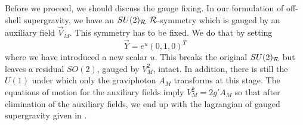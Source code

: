 \documentclass[a4paper,12pt, twoside]{article}
\numberwithin{equation}{section}
\begin{document}
Before we proceed, we should discuss the gauge fixing. In our 
formulation of off-shell supergravity, we have an $SU(2)_{\cal R}$ ${\cal 
R}$-symmetry which is gauged by an auxiliary field $\vec{V}_M$. This symmetry 
has to be fixed. We do that by setting \cite{deWit:1983na}
\begin{equation}
\vec{Y}=e^u(0,1,0)^T\label{eichfixx}
\end{equation}
where we have introduced a new scalar $u$. This breaks the original 
$SU(2)_{\cal R}$ but leaves a residual $SO(2)$, gauged by $V_M^2$, intact. 
In addition, there is still the $U(1)$ under which only the graviphoton 
$A_M$ transforms at this stage. The equations of motion for the 
auxiliary fields imply $V_M^2=2g'A_M$ so that after elimination of the 
auxiliary fields, we end up with the lagrangian of gauged supergravity given 
in \cite{Zucker:1999fn}. 
\end{document}

